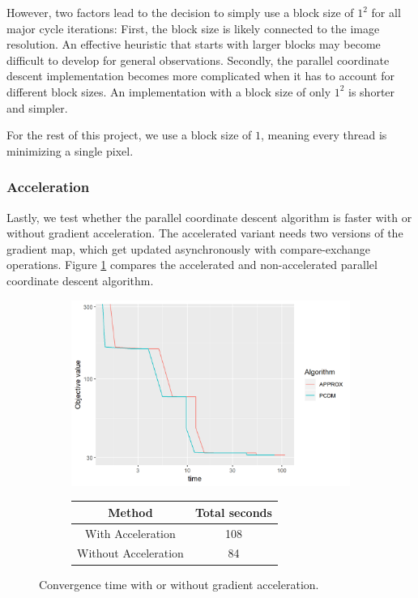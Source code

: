 However, two factors lead to the decision to simply use a block size of $1^2$ for all major cycle iterations: First, the block size is likely connected to the image resolution. An effective heuristic that starts with larger blocks may become difficult to develop for general observations. Secondly, the parallel coordinate descent implementation becomes more complicated when it has to account for different block sizes. An implementation with a block size of only $1^2$ is shorter and simpler.

For the rest of this project, we use a block size of $1$, meaning every thread is minimizing a single pixel.


\subsubsection{Acceleration}
Lastly, we test whether the parallel coordinate descent algorithm is faster with or without gradient acceleration. The accelerated variant needs two versions of the gradient map, which get updated asynchronously with compare-exchange operations. Figure \ref{pcdm:results:acc} compares the accelerated and non-accelerated parallel coordinate descent algorithm.

\begin{figure}[h]
	\centering
	\begin{subfigure}{0.6\linewidth}
		\includegraphics[width=1.0\linewidth]{./chapters/05.pcdm/parameters/acceleration.png}
	\end{subfigure}
	\begin{subfigure}{0.35\linewidth}
		\begin{tabular}{c | c}
			Method & Total seconds \\ \hline
			With Acceleration & 108 \\
			Without Acceleration & 84 \\
		\end{tabular}
	\end{subfigure}
	\caption{Convergence time with or without gradient acceleration.}
	\label{pcdm:results:acc}
\end{figure}

